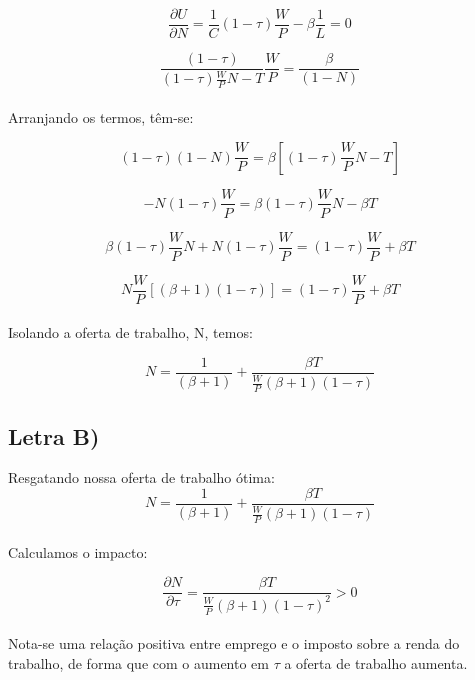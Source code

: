 \documentclass{article}
\begin{document}
\begin{equation}
\frac{\partial U}{\partial N}= \frac{1}{C}(1-\tau)\frac{W}{P} - \beta\frac{1}{L} = 0
\end{equation}

\begin{equation}
\frac{(1-\tau)}{(1-\tau)\frac{W}{P}N-T}\frac{W}{P} = \frac{\beta}{(1-N)}
\end{equation}
\\
Arranjando os termos, têm-se:

\begin{equation}
(1-\tau)(1-N)\frac{W}{P} = \beta[(1-\tau)\frac{W}{P}N-T]
\end{equation}

\begin{equation}
[(1-\tau)\frac{W}{P}] - N(1-\tau)\frac{W}{P} = \beta(1-\tau)\frac{W}{P}N-\beta T
\end{equation}

\begin{equation}
\beta(1-\tau)\frac{W}{P}N + N(1-\tau)\frac{W}{P} = (1-\tau)\frac{W}{P} + \beta T
\end{equation}

\begin{equation}
N\frac{W}{P}[(\beta+1)(1-\tau)] = (1-\tau)\frac{W}{P} + \beta T
\end{equation}
\\
Isolando a oferta de trabalho, N, temos:

\begin{equation}
N = \frac{1}{(\beta+1)} + \frac{\beta T}{\frac{W}{P}(\beta+1)(1-\tau)}
\end{equation}

\clearpage


\subsection*{Letra B)}

Resgatando nossa oferta de trabalho ótima:
\begin{equation}
N = \frac{1}{(\beta+1)} + \frac{\beta T}{\frac{W}{P}(\beta+1)(1-\tau)}
\end{equation}
\\
Calculamos o impacto:

\begin{equation}
\frac{\partial  N}{\partial  \tau} =  \frac{\beta T}{\frac{W}{P}(\beta+1)(1-\tau)^2} > 0
\end{equation}
\\
Nota-se uma relação positiva entre emprego e o imposto sobre a renda do trabalho, de forma que com o aumento em  $\tau$ a oferta de trabalho aumenta.
\end{document}
